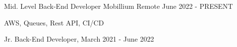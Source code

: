 
\begin{cventries}
  \cventry
    {Mid. Level Back-End Developer} %
    {Mobillium} %
    {Remote} %
    {June 2022 - PRESENT} %
    {
      \begin{cvitems} %
        \item AWS, Queues, Rest API, CI/CD
      	\item Jr. Back-End Developer, March 2021 - June 2022
      \end{cvitems}
    }
\end{cventries}
